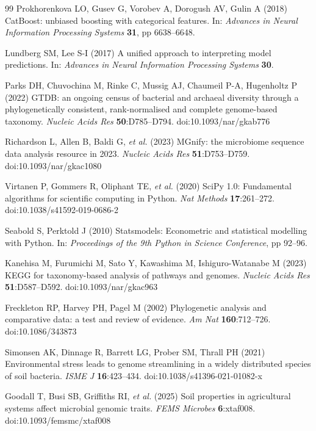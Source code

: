 \documentclass[times]{zHenriquesLab-StyleBioRxiv}
\begin{document}
\begin{thebibliography}{99}
Prokhorenkova LO, Gusev G, Vorobev A, Dorogush AV, Gulin A (2018)
CatBoost: unbiased boosting with categorical features. In:
\textit{Advances in Neural Information Processing Systems} \textbf{31},
pp 6638--6648.

Lundberg SM, Lee S-I (2017) A unified approach to interpreting model
predictions. In: \textit{Advances in Neural Information Processing
Systems} \textbf{30}.

Parks DH, Chuvochina M, Rinke C, Mussig AJ, Chaumeil P-A, Hugenholtz P
(2022) GTDB: an ongoing census of bacterial and archaeal diversity through
a phylogenetically consistent, rank-normalised and complete genome-based
taxonomy. \textit{Nucleic Acids Res} \textbf{50}:D785--D794.
doi:10.1093/nar/gkab776

Richardson L, Allen B, Baldi G, \textit{et al.} (2023) MGnify: the
microbiome sequence data analysis resource in 2023. \textit{Nucleic Acids
Res} \textbf{51}:D753--D759. doi:10.1093/nar/gkac1080

Virtanen P, Gommers R, Oliphant TE, \textit{et al.} (2020) SciPy 1.0:
Fundamental algorithms for scientific computing in Python.
\textit{Nat Methods} \textbf{17}:261--272. doi:10.1038/s41592-019-0686-2

Seabold S, Perktold J (2010) Statsmodels: Econometric and statistical
modelling with Python. In: \textit{Proceedings of the 9th Python in
Science Conference}, pp 92--96.

Kanehisa M, Furumichi M, Sato Y, Kawashima M, Ishiguro-Watanabe M
(2023) KEGG for taxonomy-based analysis of pathways and genomes.
\textit{Nucleic Acids Res} \textbf{51}:D587--D592.
doi:10.1093/nar/gkac963

Freckleton RP, Harvey PH, Pagel M (2002) Phylogenetic analysis and
comparative data: a test and review of evidence. \textit{Am Nat}
\textbf{160}:712--726. doi:10.1086/343873

Simonsen AK, Dinnage R, Barrett LG, Prober SM, Thrall PH (2021)
Environmental stress leads to genome streamlining in a widely distributed
species of soil bacteria. \textit{ISME J} \textbf{16}:423--434.
doi:10.1038/s41396-021-01082-x

Goodall T, Busi SB, Griffiths RI, \textit{et al.} (2025) Soil properties
in agricultural systems affect microbial genomic traits. \textit{FEMS
Microbes} \textbf{6}:xtaf008. doi:10.1093/femsmc/xtaf008


\end{thebibliography}
\end{document}

